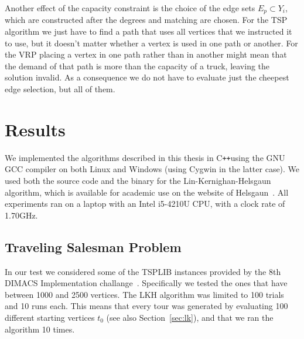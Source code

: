 \documentclass[titlepage, 12pt]{article}
\newcommand{\cpp}[0]{C\texttt{++}}
\begin{document}
    Another effect of the capacity constraint is the choice of the edge sets $E_p \subset Y_i$,
    which are constructed after the degrees and matching are chosen. For the TSP algorithm we just
    have to find a path that uses all vertices that we instructed it to use, but it doesn't matter
    whether a vertex is used in one path or another. For the VRP placing a vertex in one path rather
    than in another might mean that the demand of that path is more than the capacity of a truck,
    leaving the solution invalid. As a consequence we do not have to evaluate just the cheepest edge
    selection, but all of them.




%
%
\section{Results}
\label{sec:results}
We implemented the algorithms described in this thesis in \cpp\;using the GNU GCC compiler on both
Linux and Windows (using Cygwin in the latter case). We used both the source code and the binary for
the Lin-Kernighan-Helsgaun algorithm, which is available for academic use on the website of
Helsgaun~\cite{lkh-url}.
All experiments ran on a laptop with an Intel i5-4210U CPU, with a clock rate of 1.70GHz.

    \subsection{Traveling Salesman Problem}
    In our test we considered some of the TSPLIB instances provided by the 8th DIMACS Implementation
    challange~\cite{tsp-instances}. Specifically we tested the ones that have between 1000 and 2500
    vertices.  The LKH algorithm was limited to 100 trials and 10 runs each. This means that every
    tour was generated by evaluating 100 different starting vertices $t_0$ (see also
    Section~\ref{sec:lk}), and that we ran the algorithm 10 times.
\end{document}
